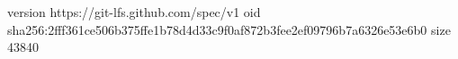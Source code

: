 version https://git-lfs.github.com/spec/v1
oid sha256:2fff361ce506b375ffe1b78d4d33c9f0af872b3fee2ef09796b7a6326e53e6b0
size 43840
